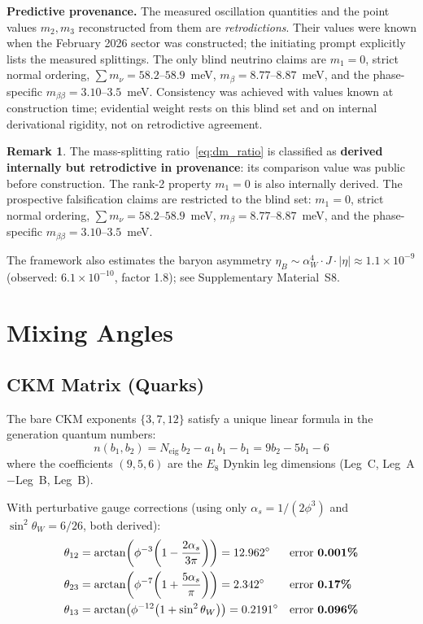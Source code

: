 \documentclass[12pt,a4paper]{article}
\theoremstyle{definition}
\newtheorem{remark}{Remark}
\begin{document}
\textbf{Predictive provenance.}  The measured oscillation quantities and the
point values $m_2,m_3$ reconstructed from them are \emph{retrodictions}.
Their values were known when the February 2026 sector was constructed; the
initiating prompt explicitly lists the measured splittings.  The only blind
neutrino claims are $m_1=0$, strict normal ordering,
$\sum m_\nu=58.2$--$58.9$~meV, $m_\beta=8.77$--$8.87$~meV, and the
phase-specific $m_{\beta\beta}=3.10$--$3.5$~meV.  Consistency was achieved
with values known at construction time; evidential weight rests on this blind
set and on internal derivational rigidity, not on retrodictive agreement.

\begin{remark}
The mass-splitting ratio~\eqref{eq:dm_ratio} is classified as
\textbf{derived internally but retrodictive in provenance}: its comparison
value was public before construction.  The rank-2 property $m_1=0$ is also
internally derived.  The prospective falsification claims are restricted to
the blind set: $m_1=0$, strict normal ordering,
$\sum m_\nu=58.2$--$58.9$~meV, $m_\beta=8.77$--$8.87$~meV, and the
phase-specific $m_{\beta\beta}=3.10$--$3.5$~meV.
\end{remark}

The framework also estimates the baryon asymmetry $\eta_B \sim \alpha_W^4 \cdot J \cdot |\eta| \approx 1.1 \times 10^{-9}$ (observed: $6.1 \times 10^{-10}$, factor 1.8); see Supplementary Material~S8.


\section{Mixing Angles}
\label{sec:mixing}

\subsection{CKM Matrix (Quarks)}
\label{sec:ckm}

The bare CKM exponents $\{3, 7, 12\}$ satisfy a unique linear formula in the generation quantum numbers:
\begin{equation}
\boxed{n(b_1, b_2) = N_{\text{eig}}\, b_2 - a_1\, b_1 - b_1 = 9b_2 - 5b_1 - 6}
\end{equation}
where the coefficients $(9, 5, 6)$ are the $E_8$ Dynkin leg dimensions (Leg~C, Leg~A$-$Leg~B, Leg~B).

With perturbative gauge corrections (using only $\alpha_s = 1/(2\phi^3)$ and $\sin^2\theta_W = 6/26$, both derived):
\begin{align}
\theta_{12} &= \arctan\!\left(\phi^{-3}\!\left(1 - \frac{2\alpha_s}{3\pi}\right)\right) = 12.962^\circ && \text{error \textbf{0.001\%}} \\
\theta_{23} &= \arctan\!\left(\phi^{-7}\!\left(1 + \frac{5\alpha_s}{\pi}\right)\right) = 2.342^\circ && \text{error \textbf{0.17\%}} \\
\theta_{13} &= \arctan\!\left(\phi^{-12}\!\left(1 + \sin^2\theta_W\right)\right) = 0.2191^\circ && \text{error \textbf{0.096\%}}
\end{align}
\end{document}
